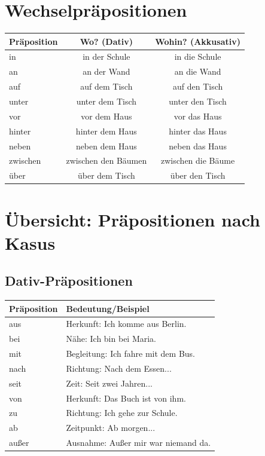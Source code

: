 \section{Wechselpräpositionen}
\label{sec:Wechselpraepositionen}

\begin{center}
\begin{tabular}{|l|c|c|}
\hline
\textbf{Präposition} & \textbf{Wo? (Dativ)} & \textbf{Wohin? (Akkusativ)} \\ \hline
in & in der Schule & in die Schule \\ \hline
an & an der Wand & an die Wand \\ \hline
auf & auf dem Tisch & auf den Tisch \\ \hline
unter & unter dem Tisch & unter den Tisch \\ \hline
vor & vor dem Haus & vor das Haus \\ \hline
hinter & hinter dem Haus & hinter das Haus \\ \hline
neben & neben dem Haus & neben das Haus \\ \hline
zwischen & zwischen den Bäumen & zwischen die Bäume \\ \hline
über & über dem Tisch & über den Tisch \\ \hline
\end{tabular}
\end{center}

\section{Übersicht: Präpositionen nach Kasus}
\label{sec:PraepositionenNachKasus}

\subsection{Dativ-Präpositionen}
\begin{center}
\begin{tabular}{|l|l|}
\hline
\textbf{Präposition} & \textbf{Bedeutung/Beispiel} \\ \hline
aus & Herkunft: Ich komme aus Berlin. \\ \hline
bei & Nähe: Ich bin bei Maria. \\ \hline
mit & Begleitung: Ich fahre mit dem Bus. \\ \hline
nach & Richtung: Nach dem Essen... \\ \hline
seit & Zeit: Seit zwei Jahren... \\ \hline
von & Herkunft: Das Buch ist von ihm. \\ \hline
zu & Richtung: Ich gehe zur Schule. \\ \hline
ab & Zeitpunkt: Ab morgen... \\ \hline
außer & Ausnahme: Außer mir war niemand da. \\ \hline
\end{tabular}
\end{center}

